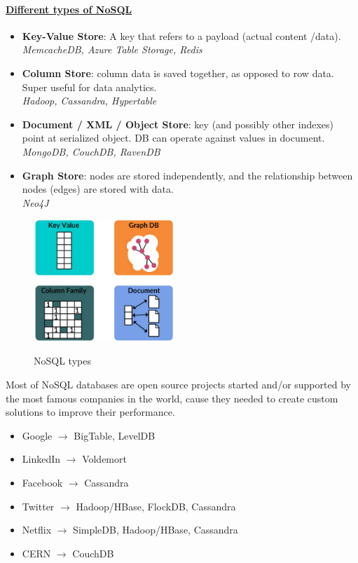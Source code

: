 \documentclass[10pt,a4paper]{article}
\begin{document}
\paragraph{\uline{Different types of NoSQL}}
\begin{itemize}
	\item \textbf{Key-Value Store}: A key that refers to a payload (actual content /data). \\ \textit{MemcacheDB, Azure Table Storage, Redis}
	\item \textbf{Column Store}: column data is saved together, as opposed to row data. Super useful for data analytics. \\ \textit{Hadoop, Cassandra, Hypertable}
	\item \textbf{Document / XML / Object Store}: key (and possibly other indexes) point at serialized object. DB can operate against values in document. \\ \textit{MongoDB, CouchDB, RavenDB}
	\item \textbf{Graph Store}: nodes are stored independently, and the relationship between nodes (edges) are stored with data. \\ \textit{Neo4J}
\end{itemize}
\begin{figure}[h!]
 \hfill \includegraphics[width=150pt]{images/nosqltypes.jpeg}\hspace*{\fill}
  \label{fig:nosqltypes}
  \caption{NoSQL types}
\end{figure} 
\pagebreak
Most of NoSQL databases are open source projects started and/or supported by the most famous companies in the world, cause they needed to create custom solutions to improve their performance.
\begin{itemize}
	\item Google $\rightarrow$ BigTable, LevelDB
	\item LinkedIn $\rightarrow$ Voldemort
	\item Facebook $\rightarrow$ Cassandra
	\item Twitter $\rightarrow$ Hadoop/HBase, FlockDB, Cassandra
	\item Netflix $\rightarrow$ SimpleDB, Hadoop/HBase, Cassandra
	\item CERN $\rightarrow$ CouchDB
\end{itemize}
\end{document}
